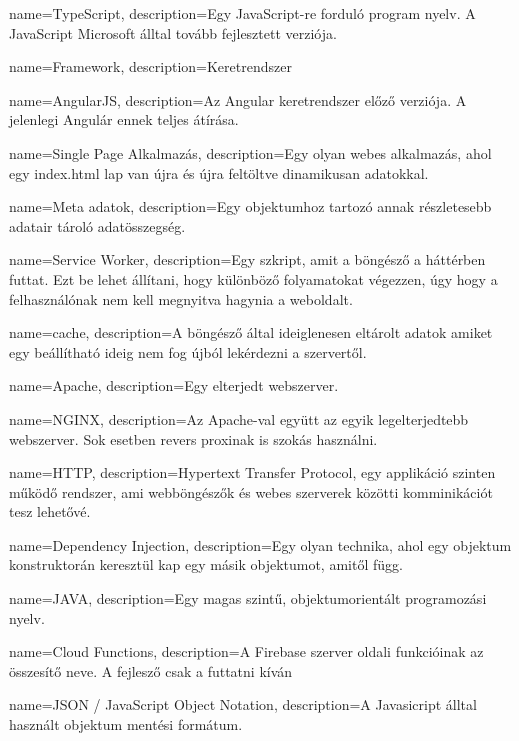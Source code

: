 {
        name=TypeScript,
        description={Egy JavaScript-re forduló program nyelv. A JavaScript Microsoft álltal tovább fejlesztett verziója.}
}

{
        name=Framework,
        description={Keretrendszer}
}

{
        name=AngularJS,
        description={Az Angular keretrendszer előző verziója. A jelenlegi Angulár ennek teljes átírása.}
}

{
        name=Single Page Alkalmazás,
        description={Egy olyan webes alkalmazás, ahol egy index.html lap van újra és újra feltöltve dinamikusan adatokkal.}
}

{
        name=Meta adatok,
        description={Egy objektumhoz tartozó annak  részletesebb adatair tároló adatösszegség.}
}

{
        name=Service Worker,
        description={Egy szkript, amit a böngésző a háttérben futtat. 
        Ezt be lehet állítani, hogy különböző folyamatokat végezzen, úgy hogy a felhasználónak nem kell megnyitva hagynia a weboldalt.}
}

{
        name=cache,
        description={A böngésző által ideiglenesen eltárolt adatok amiket egy beállítható ideig nem fog újból lekérdezni a szervertől.}
}

{
        name=Apache,
        description={Egy elterjedt webszerver.}
}

{
        name=NGINX,
        description={Az \Gls{Apache}-val együtt az egyik legelterjedtebb webszerver. Sok esetben revers proxinak is szokás használni.}
}

{
        name=HTTP,
        description={Hypertext Transfer Protocol, egy applikáció szinten működő rendszer, ami webböngészők és webes szerverek közötti komminikációt tesz lehetővé.}
}

{
        name=Dependency Injection,
        description={Egy olyan technika, ahol egy objektum konstruktorán keresztül kap egy másik objektumot, amitől függ.}
}

{
        name=JAVA,
        description={Egy magas szintű, objektumorientált programozási nyelv.}
}

{
        name=Cloud Functions,
        description={A Firebase szerver oldali funkcióinak az összesítő neve. A fejlesző csak a futtatni kíván}
}

{
        name=JSON / JavaScript Object Notation,
        description={A Javasicript álltal használt objektum mentési formátum.}
}
